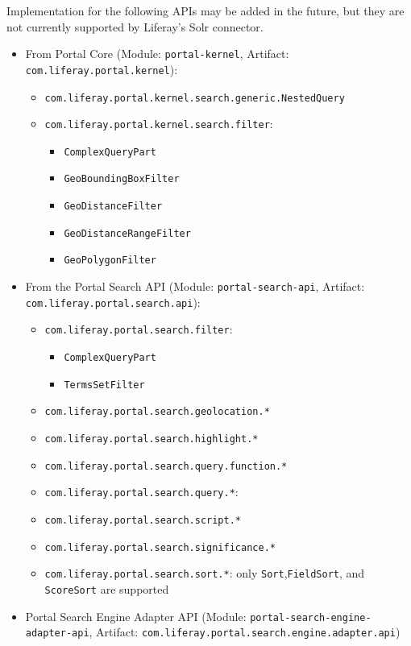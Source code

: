 Implementation for the following APIs may be added in the future, but
they are not currently supported by Liferay's Solr connector.

\begin{itemize}
\tightlist
\item
  From Portal Core (Module: \texttt{portal-kernel}, Artifact:
  \texttt{com.liferay.portal.kernel}):

  \begin{itemize}
  \tightlist
  \item
    \texttt{com.liferay.portal.kernel.search.generic.NestedQuery}
  \item
    \texttt{com.liferay.portal.kernel.search.filter}:

    \begin{itemize}
    \tightlist
    \item
      \texttt{ComplexQueryPart}
    \item
      \texttt{GeoBoundingBoxFilter}
    \item
      \texttt{GeoDistanceFilter}
    \item
      \texttt{GeoDistanceRangeFilter}
    \item
      \texttt{GeoPolygonFilter}
    \end{itemize}
  \end{itemize}
\item
  From the Portal Search API (Module: \texttt{portal-search-api},
  Artifact: \texttt{com.liferay.portal.search.api}):

  \begin{itemize}
  \tightlist
  \item
    \texttt{com.liferay.portal.search.filter}:

    \begin{itemize}
    \tightlist
    \item
      \texttt{ComplexQueryPart}
    \item
      \texttt{TermsSetFilter}
    \end{itemize}
  \item
    \texttt{com.liferay.portal.search.geolocation.*}
  \item
    \texttt{com.liferay.portal.search.highlight.*}
  \item
    \texttt{com.liferay.portal.search.query.function.*}
  \item
    \texttt{com.liferay.portal.search.query.*}:
  \item
    \texttt{com.liferay.portal.search.script.*}
  \item
    \texttt{com.liferay.portal.search.significance.*}
  \item
    \texttt{com.liferay.portal.search.sort.*}: only
    \texttt{Sort},\texttt{FieldSort}, and \texttt{ScoreSort} are
    supported
  \end{itemize}
\item
  Portal Search Engine Adapter API (Module:
  \texttt{portal-search-engine-adapter-api}, Artifact:
  \texttt{com.liferay.portal.search.engine.adapter.api})


\end{itemize}
